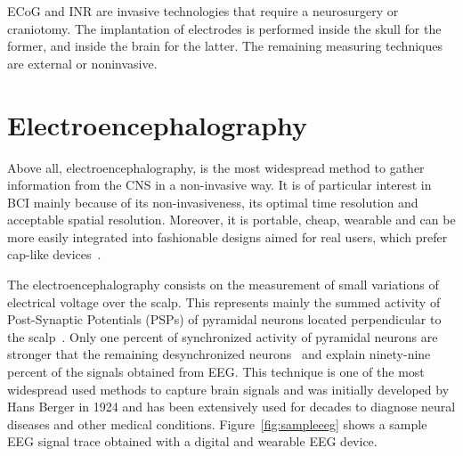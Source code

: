ECoG and INR are invasive technologies that require a neurosurgery or craniotomy. The implantation of electrodes is performed inside the skull for the former, and inside the brain for the latter.   The remaining measuring techniques are external or noninvasive.  

\section{Electroencephalography}
\label{EEG}
Above all, electroencephalography, is the most widespread method to gather information from the CNS in a non-invasive way. It is of particular interest in BCI mainly because of its non-invasiveness, its optimal time resolution and acceptable spatial resolution. Moreover, it is portable, cheap, wearable and can be more easily integrated into fashionable designs aimed for real users, which prefer cap-like devices~\cite{Huggins2015}. 

The electroencephalography consists on the measurement of small variations of electrical voltage over the scalp. This represents mainly the summed activity of Post-Synaptic Potentials (PSPs) of pyramidal neurons located perpendicular to the scalp~\cite{Nam2018}. Only one percent of synchronized activity of pyramidal neurons are stronger that the remaining desynchronized neurons~\cite{Schomer2010} and explain ninety-nine percent of the signals obtained from EEG.  This technique is one of the most widespread used methods to capture brain signals and was initially developed by Hans Berger in 1924 and has been extensively used for decades to diagnose neural diseases and other medical conditions.  Figure~\ref{fig:sampleeeg} shows a sample EEG signal trace obtained with a digital and wearable EEG device.



